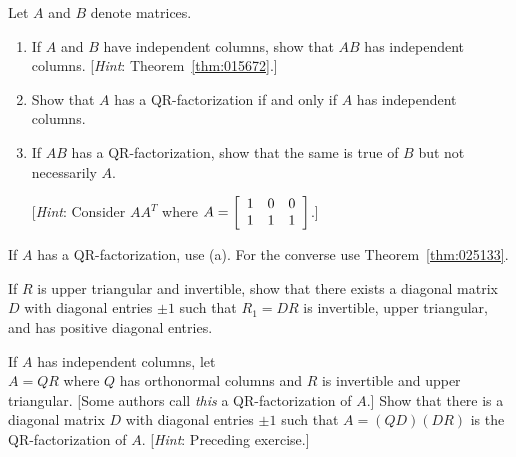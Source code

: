 \begin{multicols}{2}
\begin{ex}
\begin{sol}
\begin{enumerate}[label={\alph*.}]
\end{enumerate}
\end{sol}
\end{ex}

\begin{ex}
Let $A$ and $B$ denote matrices.


\begin{enumerate}[label={\alph*.}]
\item If $A$ and $B$ have independent columns, show that $AB$ has independent columns. [\textit{Hint}: Theorem~\ref{thm:015672}.]

\item Show that $A$ has a QR-factorization if and only if $A$ has independent columns.

\item If $AB$ has a QR-factorization, show that the same is true of $B$ but not necessarily $A$.


[\textit{Hint}: Consider $AA^{T}$ where $A = \left[ \begin{array}{rrr}
1 & 0 & 0 \\
1 & 1 & 1
\end{array}\right]$.]

\end{enumerate}
\begin{sol}
If $A$ has a QR-factorization, use (a). For the converse use Theorem~\ref{thm:025133}.
\end{sol}
\end{ex}

\begin{ex}
If $R$ is upper triangular and invertible, show that there exists a diagonal matrix $D$ with diagonal entries $\pm 1$ such that $R_{1} = DR$ is invertible, upper triangular, and has positive diagonal entries.
\end{ex}

\begin{ex}
If $A$ has independent columns, let \\ $A = QR$ where $Q$ has orthonormal columns and $R$ is invertible and upper triangular. [Some authors call \textit{this} a QR-factorization of $A$.] Show that there is a diagonal matrix $D$ with diagonal entries $\pm 1$ such that $A = (QD)(DR)$ is the QR-factorization of $A$. [\textit{Hint}: Preceding exercise.]
\end{ex}
\end{multicols}
